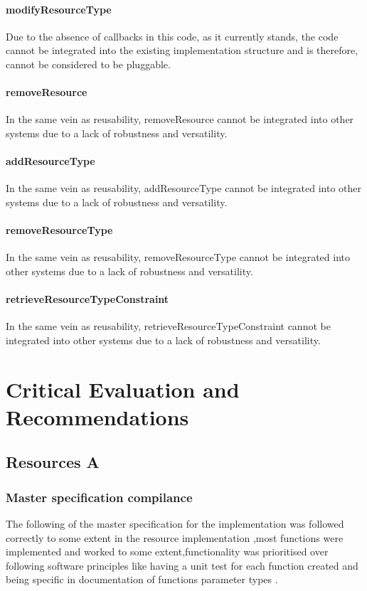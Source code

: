 \documentclass[a4paper]{article}
\begin{document}
\paragraph{modifyResourceType}
Due to the absence of callbacks in this code, as it currently stands, the code cannot be integrated into the existing implementation structure and is therefore, cannot be considered to be pluggable.

\paragraph{removeResource}
In the same vein as reusability, removeResource cannot be integrated into other systems due to a lack of robustness and versatility.

\paragraph{addResourceType}
In the same vein as reusability, addResourceType cannot be integrated into other systems due to a lack of robustness and versatility.

\paragraph{removeResourceType}
In the same vein as reusability, removeResourceType cannot be integrated into other systems due to a lack of robustness and versatility.

\paragraph{retrieveResourceTypeConstraint}
In the same vein as reusability, retrieveResourceTypeConstraint cannot be integrated into other systems due to a lack of robustness and versatility.


\section {Critical Evaluation and Recommendations}
\subsection {Resources A}
\subsubsection {Master specification compilance}
The following of the master specification for the implementation was followed correctly to some extent in the resource implementation ,most functions were implemented and worked to some extent,functionality was prioritised over following software principles like having a unit test for each function created and being specific in documentation of functions parameter types .
\end{document}
